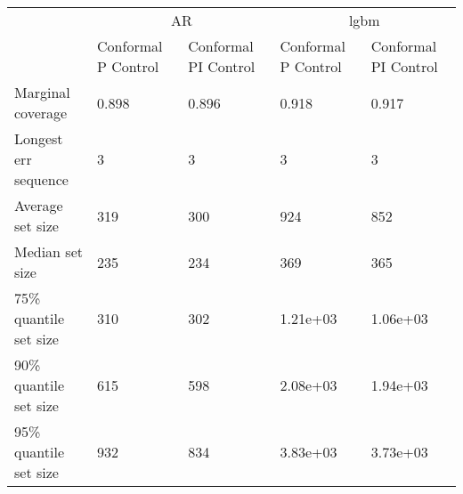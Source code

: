\begin{tabular}{lllll}
\toprule
& \multicolumn{2}{c}{AR}& \multicolumn{2}{c}{lgbm} \\
& Conformal P Control & Conformal PI Control & Conformal P Control & Conformal PI Control \\
\midrule
Marginal coverage & 0.898 & 0.896 & 0.918 & 0.917 \\
Longest err sequence & 3 & 3 & 3 & 3 \\
Average set size & 319 & 300 & 924 & 852 \\
Median set size & 235 & 234 & 369 & 365 \\
75\% quantile set size & 310 & 302 & 1.21e+03 & 1.06e+03 \\
90\% quantile set size & 615 & 598 & 2.08e+03 & 1.94e+03 \\
95\% quantile set size & 932 & 834 & 3.83e+03 & 3.73e+03 \\
\bottomrule
\end{tabular}
